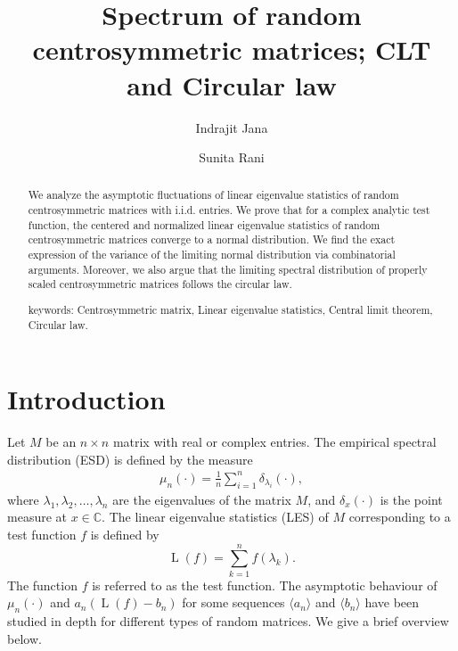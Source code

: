 \documentclass[12pt]{amsart}
\title{Spectrum of random centrosymmetric matrices; CLT and Circular law}
\author{Indrajit Jana}
\author{Sunita Rani}
\theoremstyle{plain}
\theoremstyle{definition}
\begin{document}
\date{}


\begin{abstract}
We analyze the asymptotic fluctuations of linear eigenvalue statistics of random centrosymmetric matrices with i.i.d. entries. We prove that for a complex analytic test function, the centered and normalized linear eigenvalue statistics of random centrosymmetric matrices converge to a normal distribution. We find the exact expression of the variance of the limiting normal distribution via combinatorial arguments. Moreover, we also argue that the limiting spectral distribution of properly scaled centrosymmetric matrices follows the circular law.

keywords: Centrosymmetric matrix, Linear eigenvalue statistics, Central limit theorem, Circular law.
\end{abstract}


\maketitle




\section{Introduction} Let $M$ be an $n \times n$ matrix with real or complex entries. The empirical spectral distribution (ESD) is defined by the measure
\begin{align*}
    \mu_{n}(\cdot) = \frac{1}{n}\sum_{i=1}^{n}\delta_{\lambda_{i}}(\cdot),
\end{align*}
where $\lambda_{1}, \lambda_{2}, \ldots,\lambda_{n}$ are the eigenvalues of the matrix $M$, and $\delta_{x}(\cdot)$ is the point measure at $x\in \mathbb{C}$. The linear eigenvalue statistics (LES) of $M$ corresponding to a test function $f$ is defined by
$$
\operatorname{L}(f)= \sum_{k=1}^n f\left(\lambda_k\right).
$$
The function $f$ is referred to as the test function. The asymptotic behaviour of $\mu_{n}(\cdot)$ and $a_{n}(\operatorname{L}(f)-b_{n})$ for some sequences $ \langle a_{n}\rangle$ and  $\langle b_{n} \rangle $ have been studied in depth for different types of random matrices. We give a brief overview below.
\end{document}
